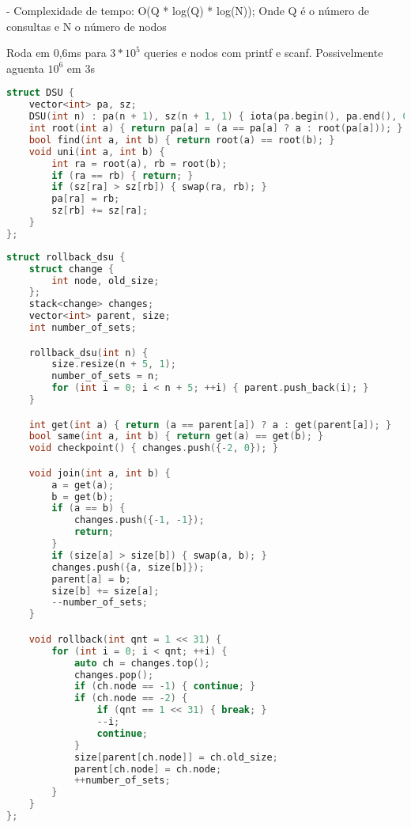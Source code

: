 \documentclass[11pt, a4paper, twoside]{article}
\begin{document}
- Complexidade de tempo: O(Q * log(Q) * log(N)); Onde Q é o número de consultas e N o número de nodos

Roda em 0,6ms para $3 * 10^5$ queries e nodos com printf e scanf.  
Possivelmente aguenta $10^6$ em 3s


\begin{lstlisting}[language=C++]
struct DSU {
    vector<int> pa, sz;
    DSU(int n) : pa(n + 1), sz(n + 1, 1) { iota(pa.begin(), pa.end(), 0); }
    int root(int a) { return pa[a] = (a == pa[a] ? a : root(pa[a])); }
    bool find(int a, int b) { return root(a) == root(b); }
    void uni(int a, int b) {
        int ra = root(a), rb = root(b);
        if (ra == rb) { return; }
        if (sz[ra] > sz[rb]) { swap(ra, rb); }
        pa[ra] = rb;
        sz[rb] += sz[ra];
    }
};
\end{lstlisting}

\begin{lstlisting}[language=C++]
struct rollback_dsu {
    struct change {
        int node, old_size;
    };
    stack<change> changes;
    vector<int> parent, size;
    int number_of_sets;

    rollback_dsu(int n) {
        size.resize(n + 5, 1);
        number_of_sets = n;
        for (int i = 0; i < n + 5; ++i) { parent.push_back(i); }
    }

    int get(int a) { return (a == parent[a]) ? a : get(parent[a]); }
    bool same(int a, int b) { return get(a) == get(b); }
    void checkpoint() { changes.push({-2, 0}); }

    void join(int a, int b) {
        a = get(a);
        b = get(b);
        if (a == b) {
            changes.push({-1, -1});
            return;
        }
        if (size[a] > size[b]) { swap(a, b); }
        changes.push({a, size[b]});
        parent[a] = b;
        size[b] += size[a];
        --number_of_sets;
    }

    void rollback(int qnt = 1 << 31) {
        for (int i = 0; i < qnt; ++i) {
            auto ch = changes.top();
            changes.pop();
            if (ch.node == -1) { continue; }
            if (ch.node == -2) {
                if (qnt == 1 << 31) { break; }
                --i;
                continue;
            }
            size[parent[ch.node]] = ch.old_size;
            parent[ch.node] = ch.node;
            ++number_of_sets;
        }
    }
};
\end{lstlisting}
\end{document}
